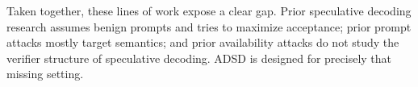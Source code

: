 Taken together, these lines of work expose a clear gap. Prior speculative
decoding research assumes benign prompts and tries to maximize acceptance;
prior prompt attacks mostly target semantics; and prior availability attacks do
not study the verifier structure of speculative decoding. ADSD is designed for
precisely that missing setting.
